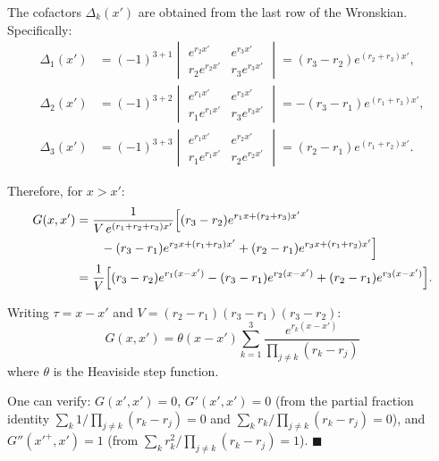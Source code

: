 \documentclass[12pt]{article}
\begin{document}
The cofactors $\Delta_k(x')$ are obtained from the last row of the Wronskian. Specifically:
\begin{align}
\Delta_1(x') &= (-1)^{3+1}\begin{vmatrix} e^{r_2 x'} & e^{r_3 x'} \\ r_2 e^{r_2 x'} & r_3 e^{r_3 x'} \end{vmatrix} = (r_3 - r_2)e^{(r_2+r_3)x'}, \\
\Delta_2(x') &= (-1)^{3+2}\begin{vmatrix} e^{r_1 x'} & e^{r_3 x'} \\ r_1 e^{r_1 x'} & r_3 e^{r_3 x'} \end{vmatrix} = -(r_3 - r_1)e^{(r_1+r_3)x'}, \\
\Delta_3(x') &= (-1)^{3+3}\begin{vmatrix} e^{r_1 x'} & e^{r_2 x'} \\ r_1 e^{r_1 x'} & r_2 e^{r_2 x'} \end{vmatrix} = (r_2 - r_1)e^{(r_1+r_2)x'}.
\end{align}

Therefore, for $x > x'$:
\begin{align}
G(x,x') &= \frac{1}{V\,e^{(r_1+r_2+r_3)x'}}\Bigl[(r_3-r_2)e^{r_1 x+(r_2+r_3)x'} \\
&\qquad -(r_3-r_1)e^{r_2 x+(r_1+r_3)x'} + (r_2-r_1)e^{r_3 x+(r_1+r_2)x'}\Bigr] \\
&= \frac{1}{V}\Bigl[(r_3-r_2)e^{r_1(x-x')} - (r_3-r_1)e^{r_2(x-x')} + (r_2-r_1)e^{r_3(x-x')}\Bigr].
\end{align}

Writing $\tau = x - x'$ and $V = (r_2-r_1)(r_3-r_1)(r_3-r_2)$:
\[
\boxed{G(x,x') = \theta(x-x')\sum_{k=1}^{3}\frac{e^{r_k(x-x')}}{\prod_{j\neq k}(r_k - r_j)}}
\]
where $\theta$ is the Heaviside step function.

One can verify: $G(x',x') = 0$, $G'(x',x') = 0$ (from the partial fraction identity $\sum_k 1/\prod_{j\neq k}(r_k-r_j) = 0$ and $\sum_k r_k/\prod_{j\neq k}(r_k-r_j) = 0$), and $G''(x'^+,x') = 1$ (from $\sum_k r_k^2/\prod_{j\neq k}(r_k-r_j) = 1$). $\blacksquare$
\end{document}
